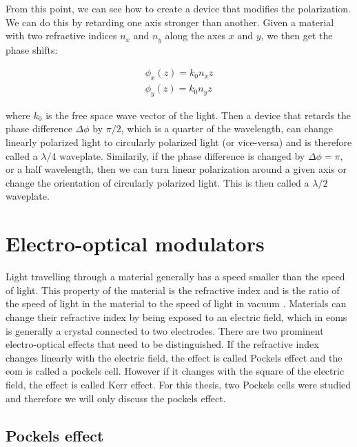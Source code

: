 From this point, we can see how to create a device that modifies the polarization. We can do this by retarding one axis stronger than another. Given a material with two refractive indices $n_x$ and $n_y$ along the axes $x$ and $y$, we then get the phase shifts:

\begin{align}
	\phi_x(z) = k_0 n_x z \\
	\phi_y(z) = k_0 n_y z
\end{align}
\label{eq:pol,phases}

where $k_0$ is the free space wave vector of the light. Then a device that retards the phase difference $\Delta \phi$ by $\pi/2$, which is a quarter of the wavelength, can change linearly polarized light to circularly polarized light (or vice-versa) and is therefore called a $\lambda / 4$ waveplate. Similarily, if the phase difference is changed by $\Delta \phi = \pi$, or a half wavelength, then we can turn linear polarization around a given axis or change the orientation of circularly polarized light. This is then called a $\lambda / 2$ waveplate.

\section{Electro-optical modulators}
\label{sec:eom}


Light travelling through a material generally has a speed smaller than the speed of light. This property of the material is the refractive index and is the ratio of the speed of light in the material to the speed of light in vacuum . Materials can change their refractive index by being exposed to an electric field, which in \acp{eom} is generally a crystal connected to two electrodes. There are two prominent electro-optical effects that need to be distinguished. If the refractive index changes linearly with the electric field, the effect is called Pockels effect and the \ac{eom} is called a pockels cell. However if it changes with the square of the electric field, the effect is called Kerr effect. For this thesis, two Pockels cells were studied and therefore we will only discuss the pockels effect.


\subsection{Pockels effect}


